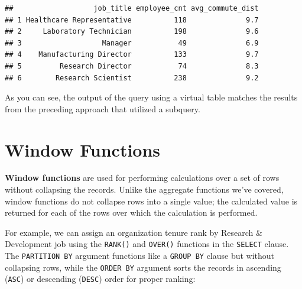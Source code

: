 \documentclass[
]{book}
\begin{document}
\begin{verbatim}
##                   job_title employee_cnt avg_commute_dist
## 1 Healthcare Representative          118              9.7
## 2     Laboratory Technician          198              9.6
## 3                   Manager           49              6.9
## 4    Manufacturing Director          133              9.7
## 5         Research Director           74              8.3
## 6        Research Scientist          238              9.2
\end{verbatim}

As you can see, the output of the query using a virtual table matches the results from the preceding approach that utilized a subquery.

\hypertarget{window-functions}{%
\section{Window Functions}\label{window-functions}}

\textbf{Window functions} are used for performing calculations over a set of rows without collapsing the records. Unlike the aggregate functions we've covered, window functions do not collapse rows into a single value; the calculated value is returned for each of the rows over which the calculation is performed.

For example, we can assign an organization tenure rank by Research \& Development job using the \texttt{RANK()} and \texttt{OVER()} functions in the \texttt{SELECT} clause. The \texttt{PARTITION\ BY} argument functions like a \texttt{GROUP\ BY} clause but without collapsing rows, while the \texttt{ORDER\ BY} argument sorts the records in ascending (\texttt{ASC}) or descending (\texttt{DESC}) order for proper ranking:
\end{document}
